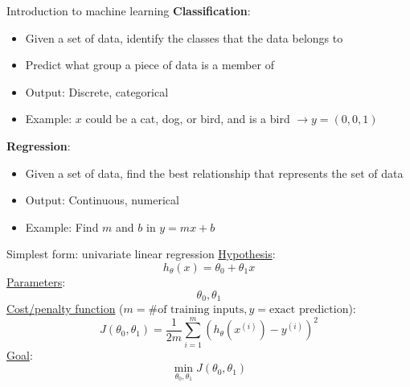 \documentclass[xetex,compress]{beamer}
\begin{document}
\begin{frame}{Introduction to machine learning}
  \textbf{Classification}:
  \begin{itemize}
  \item Given a set of data, identify the classes that the data belongs to
  \item Predict what group a piece of data is a member of
  \item Output: Discrete, categorical
  \item Example: \(x\) could be a cat, dog, or bird, and is a bird \(\rightarrow y = (0, 0, 1)\)
  \end{itemize}
  \textbf{Regression}:
  \begin{itemize}
  \item Given a set of data, find the best relationship that represents the set of data
  \item Output: Continuous, numerical
  \item Example: Find \(m\) and \(b\) in \(y=mx+b\)
  \end{itemize}
\end{frame}

\begin{frame}{Simplest form: univariate linear regression}
  \underline{Hypothesis}:
  \begin{equation*}
    h_{\theta}(x) = \theta_0 + \theta_1 x
  \end{equation*}
  \underline{Parameters}:
  \begin{equation*}
    \theta_{0}, \theta_{1}
  \end{equation*}
  \underline{Cost/penalty function} (\(m = \text{\# of training inputs}, y = \text{exact prediction}\)):
  \begin{equation*}
    J(\theta_{0}, \theta_{1}) = \frac{1}{2m} \sum_{i=1}^{m} \left( h_{\theta}(x^{(i)}) - y^{(i)} \right)^2
  \end{equation*}
  \underline{Goal}:
  \begin{equation*}
    \min_{\theta_{0}, \theta_{1}} J(\theta_{0}, \theta_{1})
  \end{equation*}
\end{frame}
\end{document}
